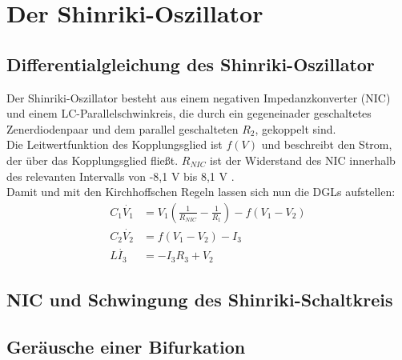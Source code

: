 

\section{Der Shinriki-Oszillator}
\label{sec:shinrikiOszi}

\subsection{Differentialgleichung des Shinriki-Oszillator}
\label{sub:dgl}

Der Shinriki-Oszillator besteht aus einem negativen Impedanzkonverter (NIC) und einem LC-Parallelschwinkreis, die durch ein gegeneinader geschaltetes Zenerdiodenpaar und dem parallel geschalteten \(R_2\), gekoppelt sind. \\
Die Leitwertfunktion des Kopplungsglied ist \( f(V)\) und beschreibt den Strom, der über das Kopplungsglied fließt.
\(R_{NIC}\) ist der Widerstand des NIC innerhalb des relevanten Intervalls von -8,1 V bis 8,1 V \citep[]{Lueck}.\\
Damit und mit den Kirchhoffschen Regeln lassen sich nun die DGLs aufstellen:
\begin{align}
    C_1 \dot{V_1} &= V_1 (\frac{1}{R_{NIC}}-\frac{1}{R_1}) - f(V_1-V_2) \\
    C_2 \dot{V_2} &= f(V_1-V_2) - I_3 \\
    L \dot{I_3} &= -I_3R_3 + V_2
\end{align}

\subsection{NIC und Schwingung des Shinriki-Schaltkreis}
\label{sub:nic}

\subsection{Geräusche einer Bifurkation}
\label{sub:tonBifurkation}